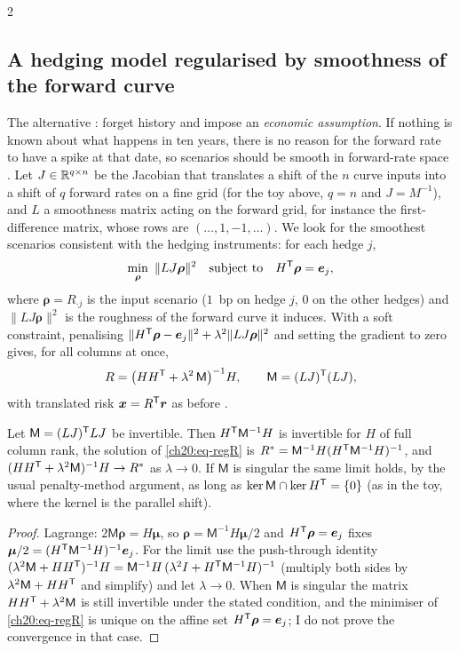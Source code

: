 \begin{paracol}{2}
\subsection{A hedging model regularised by smoothness of the forward curve}\label{ch20:sec-reghedge}
The alternative : forget history and impose an \emph{economic assumption}. If nothing is known about what happens in ten years, there is no reason for the forward rate to have a spike at that date, so scenarios should be
smooth in forward-rate space . Let $J\in\mathbb{R}^{q\times n}$ be the Jacobian that translates a shift of the $n$ curve inputs into a shift of $q$ forward rates on a fine grid (for the toy above, $q=n$ and $J=M^{-1}$), and $L$ a
smoothness matrix acting on the forward grid, for instance the first-difference matrix, whose rows are $(\dots,1,-1,\dots)$. We look for the smoothest scenarios consistent with the hedging instruments: for each hedge $j$,
\begin{equation}\label{ch20:eq-regR}
  \min_{\bm\rho}\ \|LJ\bm\rho\|^2\quad\text{subject to}\quad H^{\mathsf T}\bm\rho=\bm e_j ,
\end{equation}
where $\bm\rho=R_{\cdot j}$ is the input scenario ($1$~bp on hedge $j$, $0$ on the other hedges) and $\|LJ\bm\rho\|^2$ is the roughness of the forward curve it induces. With a soft constraint, penalising
$\|H^{\mathsf T}\bm\rho-\bm e_j\|^2+\lambda^2\|LJ\bm\rho\|^2$ and setting the gradient to zero gives, for all columns at once,
\begin{equation}\label{ch20:eq-regRsol}
  R=\bigl(HH^{\mathsf T}+\lambda^2\,\mathsf M\bigr)^{-1}H,\qquad \mathsf M=(LJ)^{\mathsf T}(LJ),
\end{equation}
with translated risk $\bm x=R^{\mathsf T}\bm r$ as before .

\begin{proposition}\label{ch20:prop-reghedge}
Let $\mathsf M=(LJ)^{\mathsf T} LJ$ be invertible. Then $H^{\mathsf T}\mathsf M^{-1}H$ is invertible for $H$ of full column rank, the solution of \eqref{ch20:eq-regR} is
$R^\ast=\mathsf M^{-1}H(H^{\mathsf T}\mathsf M^{-1}H)^{-1}$, and $(HH^{\mathsf T}+\lambda^2\mathsf M)^{-1}H\to R^\ast$ as $\lambda\to0$. If $\mathsf M$ is singular the same limit holds, by the usual penalty-method argument, as long as $\ker\mathsf M\cap\ker H^{\mathsf T}=\{0\}$ (as in the toy, where the kernel is the parallel shift).
\end{proposition}
\begin{proof}
Lagrange: $2\mathsf M\bm\rho=H\bm\mu$, so $\bm\rho=\mathsf M^{-1}H\bm\mu/2$ and $H^{\mathsf T}\bm\rho=\bm e_j$ fixes $\bm\mu/2=(H^{\mathsf T}\mathsf M^{-1}H)^{-1}\bm e_j$. For the limit use the push-through identity
$(\lambda^2\mathsf M+HH^{\mathsf T})^{-1}H=\mathsf M^{-1}H\,(\lambda^2I+H^{\mathsf T}\mathsf M^{-1}H)^{-1}$ (multiply both sides by $\lambda^2\mathsf M+HH^{\mathsf T}$ and simplify) and let $\lambda\to0$. When $\mathsf M$ is singular the matrix
$HH^{\mathsf T}+\lambda^2\mathsf M$ is still invertible under the stated condition, and the minimiser of \eqref{ch20:eq-regR} is unique on the affine set $H^{\mathsf T}\bm\rho=\bm e_j$; I do not prove the convergence in that case.
\end{proof}


\end{paracol}
